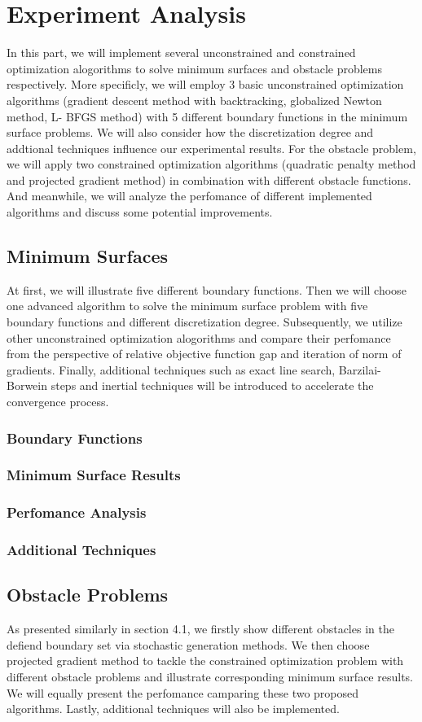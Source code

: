 \documentclass[11pt]{article}
\begin{document}
\section{Experiment Analysis}
In this part, we will implement several unconstrained and constrained optimization alogorithms to solve minimum surfaces and obstacle problems respectively. More specificly, we will employ 3 basic unconstrained optimization algorithms (gradient descent method with backtracking, globalized Newton method, L- BFGS method) with 5 different boundary functions in the minimum surface problems. We will also consider how the discretization degree and addtional techniques influence our experimental results. For the obstacle problem, we will apply two constrained optimization algorithms (quadratic penalty method and projected gradient method) in combination with different obstacle functions. And meanwhile, we will analyze the perfomance of different implemented algorithms and discuss some potential improvements.
\subsection{Minimum Surfaces}
At first, we will illustrate five different boundary functions. Then we will choose one advanced algorithm to solve the minimum surface problem with five boundary functions and different discretization degree. Subsequently, we utilize other unconstrained optimization alogorithms and compare their perfomance from the perspective of relative objective function gap and iteration of norm of gradients. Finally, additional techniques such as exact line search, Barzilai-Borwein
steps and inertial techniques will be introduced to accelerate the convergence process.
\subsubsection{Boundary Functions}
\subsubsection{Minimum Surface Results}
\subsubsection{Perfomance Analysis}
\subsubsection{Additional Techniques}
\subsection{Obstacle Problems}
As presented similarly in section 4.1, we firstly show different obstacles in the defiend boundary set via stochastic generation methods. We then choose projected gradient method to tackle the constrained optimization problem with different obstacle problems and illustrate corresponding minimum surface results. We will equally present the perfomance camparing these two proposed algorithms. Lastly, additional techniques will also be implemented. 
\end{document}
